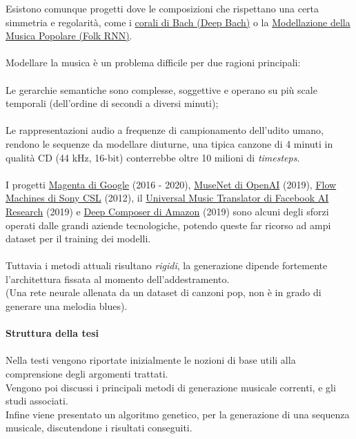 \documentclass[a4paper,12pt]{report}
\begin{document}
Esistono comunque progetti dove le composizioni che rispettano una certa simmetria e regolarità, come i \href{https://youtu.be/QiBM7-5hA6o}{corali di Bach (Deep Bach)} o la \href{https://folkrnn.org}{Modellazione della Musica Popolare (Folk RNN)}. \\
\\
Modellare la musica è un problema difficile per due ragioni principali: \\
\\
Le gerarchie semantiche sono complesse, soggettive e operano su più scale temporali (dell'ordine di secondi a diversi minuti); \\
\\
Le rappresentazioni audio a frequenze di campionamento dell'udito umano, rendono le sequenze da modellare diuturne, una tipica canzone di 4 minuti in qualità CD (44 kHz, 16-bit) conterrebbe oltre 10 milioni di \textit{timesteps}. \\
\\
I progetti \href{https://magenta.tensorflow.org }{Magenta di Google} (2016 - 2020), \href{https://openai.com/index/musenet/}{MuseNet di OpenAI} (2019), \href{https://www.flow-machines.com}{Flow Machines di Sony CSL} (2012), il \href{https://ai.meta.com/research/publications/a-universal-music-translation-network/}{Universal Music Translator di Facebook AI Research} (2019) e \href{https://aws.amazon.com/it/deepcomposer/}{Deep Composer di Amazon} (2019)
sono alcuni degli sforzi operati dalle grandi aziende tecnologiche, potendo queste far ricorso ad ampi dataset per il training dei modelli. \\ 
\\
Tuttavia i metodi attuali risultano \textit{rigidi}, la generazione dipende fortemente l'architettura fissata al momento dell'addestramento. \\
(Una rete neurale allenata da un dataset di canzoni pop, non è in grado di generare una melodia blues). \\
\\
\textbf{Struttura della tesi} \\
\\
Nella testi vengono riportate inizialmente le nozioni di base utili alla comprensione degli argomenti trattati. \\
Vengono poi discussi i principali metodi di generazione musicale correnti, e gli studi associati. \\
Infine viene presentato un algoritmo genetico, per la generazione di una sequenza musicale, discutendone i risultati conseguiti. \\
\end{document}
